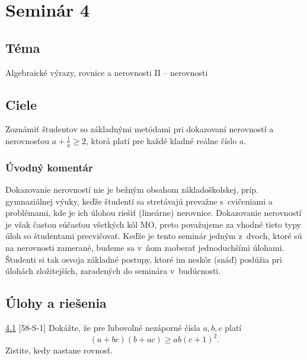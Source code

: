 \section*{Seminár 4}


\subsection*{Téma}
Algebraické výrazy, rovnice a nerovnosti II -- nerovnosti

\subsection*{Ciele}
Zoznámiť študentov so základnými metódami pri dokazovaní nerovností a nerovnosťou $a+\frac{1}{a}\geq 2$, ktorá platí pre každé kladné reálne číslo $a$.

\subsubsection*{Úvodný komentár}
Dokazovanie nerovností nie je bežným obsahom základoškolskej, príp. gymnaziálnej výuky, keďže študenti sa stretávajú prevažne s~cvičeniami a problémami, kde je ich úlohou riešiť (lineárne) nerovnice. Dokazovanie nerovností je však častou súčasťou všetkých kôl MO, preto považujeme za vhodné tieto typy úloh so študentami precvičovať. Keďže je tento seminár jedným z~dvoch, ktoré sú na nerovnosti zamerané, budeme sa v~ňom zaoberať jednoduchšími úlohami. Študenti si tak osvoja základné postupy, ktoré im neskôr (snáď) poslúžia pri úlohách zložitejších, zaradených do seminára v~budúcnosti.

\subsection*{Úlohy a riešenia}
\begin{tcolorbox}[breakable,notitle,boxrule=0pt,colback=light-gray,colframe=light-gray]\ul{4.1} [58-S-1]
Dokážte, že pre ľubovoľné nezáporné čísla $a, b, c$ platí $$(a + bc)(b + ac) \geq ab(c + 1)^2.$$
Zistite, kedy nastane rovnosť.

\end{tcolorbox}

